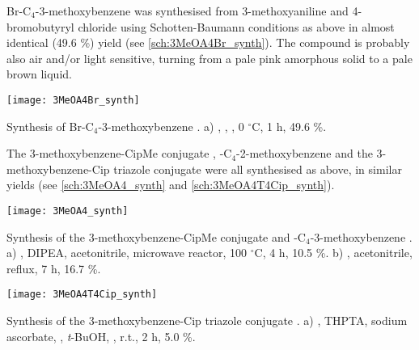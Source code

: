 Br-C$_4$-3-methoxybenzene  was synthesised from 3-methoxyaniline  and 4-bromobutyryl chloride  using Schotten-Baumann conditions as above in almost identical (49.6 \%) yield (see \ref{sch:3MeOA4Br_synth}). 
The compound is probably also air and/or light sensitive, turning from a pale pink amorphous solid to a pale brown liquid. 

\begin{scheme}[H]
	\begin{center}
		\texttt{[image: 3MeOA4Br\_synth]}
		\caption{Synthesis of Br-C$_4$-3-methoxybenzene .
			a) , , , 0 $^{\circ}$C, 1 h, 49.6 \%. \label{sch:3MeOA4Br_synth}}
	\end{center}
\end{scheme}

The 3-methoxybenzene-CipMe conjugate , 
-C$_4$-2-methoxybenzene  
and the 3-methoxybenzene-Cip triazole conjugate  were all synthesised as above, in similar yields (see \ref{sch:3MeOA4_synth} and \ref{sch:3MeOA4T4Cip_synth}).

\begin{scheme}[H]
	\begin{center}
		\texttt{[image: 3MeOA4\_synth]}
		\caption{Synthesis of the 3-methoxybenzene-CipMe conjugate  and -C$_4$-3-methoxybenzene . 
				a)  , DIPEA, acetonitrile, microwave reactor, 100 $^{\circ}$C, 4 h, 10.5 \%.
				b) , acetonitrile, reflux, 7 h, 16.7 \%.  \label{sch:3MeOA4_synth}}
	\end{center}
\end{scheme}

\begin{scheme}[H]
	\begin{center}
				\texttt{[image: 3MeOA4T4Cip\_synth]}
		\caption{Synthesis of the 3-methoxybenzene-Cip triazole conjugate . 
				a) , THPTA, sodium ascorbate, , \textit{t}-BuOH, , r.t., 2 h, 5.0 \%. \label{sch:3MeOA4T4Cip_synth}}
	\end{center}
\end{scheme}

